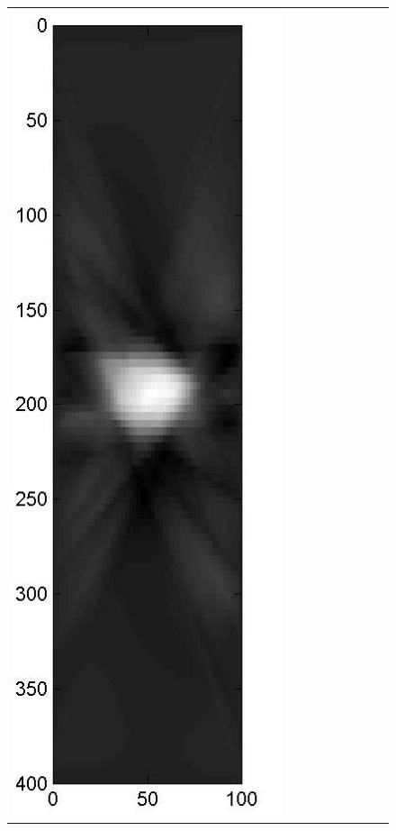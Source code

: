 \documentclass[11pt]{article}
\begin{document}
{\begin{figure}[!h]
\begin{center}
\begin{tabular}{|c|c|c|c|c|c|c|c|c|}
			\includegraphics[width=.9\iwidth]{figures/newFigs/noisy/resultsExp-4-mk}
			&

\end{tabular}
\end{center}
\end{figure}}
\end{document}
